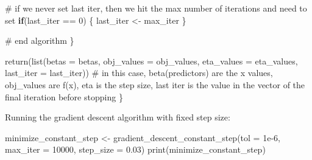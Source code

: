 \documentclass[
  letterpaper,
  DIV=11,
  numbers=noendperiod]{scrartcl}
\newenvironment{Shaded}{\begin{snugshade}}{\end{snugshade}}
\newcommand{\AttributeTok}[1]{\textcolor[rgb]{0.40,0.45,0.13}{#1}}
\newcommand{\CommentTok}[1]{\textcolor[rgb]{0.37,0.37,0.37}{#1}}
\newcommand{\ControlFlowTok}[1]{\textcolor[rgb]{0.00,0.23,0.31}{\textbf{#1}}}
\newcommand{\DecValTok}[1]{\textcolor[rgb]{0.68,0.00,0.00}{#1}}
\newcommand{\FloatTok}[1]{\textcolor[rgb]{0.68,0.00,0.00}{#1}}
\newcommand{\FunctionTok}[1]{\textcolor[rgb]{0.28,0.35,0.67}{#1}}
\newcommand{\NormalTok}[1]{\textcolor[rgb]{0.00,0.23,0.31}{#1}}
\newcommand{\OtherTok}[1]{\textcolor[rgb]{0.00,0.23,0.31}{#1}}
\newcommand{\SpecialCharTok}[1]{\textcolor[rgb]{0.37,0.37,0.37}{#1}}
\begin{document}
\begin{Shaded}
\begin{Highlighting}[]
    \CommentTok{\# if we never set last iter, then we hit the max number of iterations and need to set}
    \ControlFlowTok{if}\NormalTok{(last\_iter }\SpecialCharTok{==} \DecValTok{0}\NormalTok{) \{ last\_iter }\OtherTok{\textless{}{-}}\NormalTok{ max\_iter \}}
    
    \CommentTok{\# end algorithm}
\NormalTok{  \}}
  
  \FunctionTok{return}\NormalTok{(}\FunctionTok{list}\NormalTok{(}\AttributeTok{betas =}\NormalTok{ betas, }\AttributeTok{obj\_values =}\NormalTok{ obj\_values, }\AttributeTok{eta\_values =}\NormalTok{ eta\_values, }\AttributeTok{last\_iter =}\NormalTok{ last\_iter)) }\CommentTok{\# in this case, beta(predictors) are the x values, obj\_values are f(x), eta is the step size, last iter is the value in the vector of the final iteration before stopping}
\NormalTok{\}}
\end{Highlighting}
\end{Shaded}

Running the gradient descent algorithm with fixed step size:

\begin{Shaded}
\begin{Highlighting}[]
\NormalTok{minimize\_constant\_step }\OtherTok{\textless{}{-}} \FunctionTok{gradient\_descent\_constant\_step}\NormalTok{(}\AttributeTok{tol =} \FloatTok{1e{-}6}\NormalTok{, }\AttributeTok{max\_iter =} \DecValTok{10000}\NormalTok{, }\AttributeTok{step\_size =} \FloatTok{0.03}\NormalTok{)}
\FunctionTok{print}\NormalTok{(minimize\_constant\_step)}
\end{Highlighting}
\end{Shaded}
\end{document}
